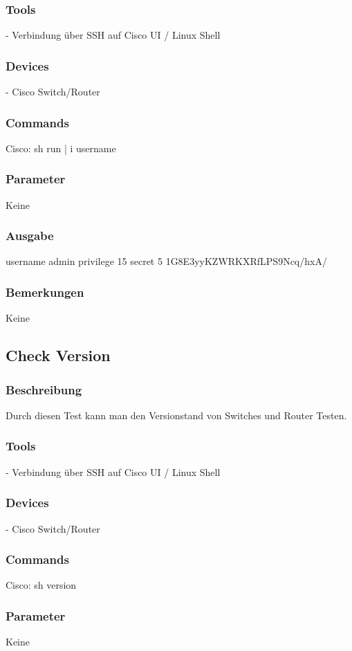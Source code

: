 \documentclass[a4,12pt]{scrartcl}
\begin{document}
\subsubsection{Tools}
- Verbindung über SSH auf Cisco UI / Linux Shell
\subsubsection{Devices}
- Cisco Switch/Router
\subsubsection{Commands}
Cisco: sh run | i username
\subsubsection{Parameter}
Keine
\subsubsection{Ausgabe}
username admin privilege 15 secret 5 1G8E3yyKZWRKXRfLPS9Ncq/hxA/
\subsubsection{Bemerkungen}
Keine

\subsection{Check Version}
\subsubsection{Beschreibung}
Durch diesen Test kann man den Versionstand von Switches und Router Testen.
\subsubsection{Tools}
- Verbindung über SSH auf Cisco UI / Linux Shell
\subsubsection{Devices}
- Cisco Switch/Router
\subsubsection{Commands}
Cisco: sh version
\subsubsection{Parameter}
Keine
\end{document}
